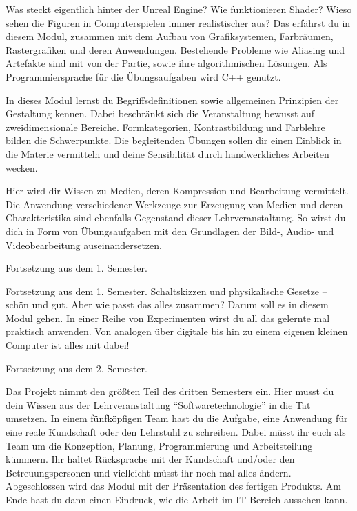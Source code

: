 \label{lec:ecg}
Was steckt eigentlich hinter der Unreal Engine? Wie funktionieren Shader?
Wieso sehen die Figuren in Computerspielen immer realistischer aus?
Das erfährst du in diesem Modul, zusammen mit dem Aufbau von Grafiksystemen, Farbräumen, Rastergrafiken und deren Anwendungen.
Bestehende Probleme wie Aliasing und Artefakte sind mit von der Partie, sowie ihre algorithmischen Lösungen.
Als Programmiersprache für die Übungsaufgaben wird C++ genutzt.

In dieses Modul lernst du Begriffsdefinitionen sowie allgemeinen Prinzipien der Gestaltung kennen.
Dabei beschränkt sich die Veranstaltung bewusst auf zweidimensionale Bereiche.
Formkategorien, Kontrastbildung und Farblehre bilden die Schwerpunkte.
Die begleitenden Übungen sollen dir einen Einblick in die Materie vermitteln und deine Sensibilität durch handwerkliches Arbeiten wecken.

Hier wird dir Wissen zu Medien, deren Kompression und Bearbeitung vermittelt.
Die Anwendung verschiedener Werkzeuge zur Erzeugung von Medien und deren Charakteristika sind ebenfalls Gegenstand dieser Lehrveranstaltung.
So wirst du dich in Form von Übungsaufgaben mit den Grundlagen der Bild-, Audio- und Videobearbeitung auseinandersetzen.

Fortsetzung aus dem 1. Semester.

Fortsetzung aus dem 1. Semester. Schaltskizzen und physikalische Gesetze -- schön und gut. Aber wie passt das alles zusammen?
Darum soll es in diesem Modul gehen. In einer Reihe von Experimenten wirst du all das gelernte mal praktisch anwenden.
Von analogen über digitale bis hin zu einem eigenen kleinen Computer ist alles mit dabei!

\newpage


Fortsetzung aus dem 2. Semester.

Das Projekt nimmt den größten Teil des dritten Semesters ein.
Hier musst du dein Wissen aus der Lehrveranstaltung \enquote{Softwaretechnologie} in die Tat umsetzen.
In einem fünfköpfigen Team hast du die Aufgabe, eine Anwendung für eine reale Kundschaft oder den Lehrstuhl zu schreiben.
Dabei müsst ihr euch als Team um die Konzeption, Planung, Programmierung und Arbeitsteilung kümmern.
Ihr haltet Rücksprache mit der Kundschaft und/oder den Betreuungspersonen und vielleicht müsst ihr noch mal alles ändern.
Abgeschlossen wird das Modul mit der Präsentation des fertigen Produkts.
Am Ende hast du dann einen Eindruck, wie die Arbeit im IT-Bereich aussehen kann.

